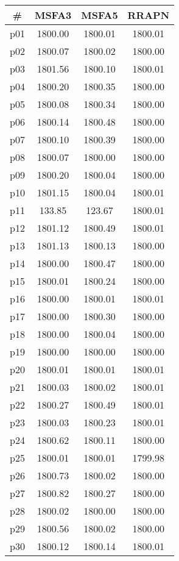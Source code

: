 \begin{tabular}{cccc}
\toprule
\textbf{\#} & \textbf{MSFA3} & \textbf{MSFA5} & \textbf{RRAPN}\\
\midrule
p01 & 1800.00 & 1800.01 & 1800.01\\
p02 & 1800.07 & 1800.02 & 1800.00\\
p03 & 1801.56 & 1800.10 & 1800.01\\
p04 & 1800.20 & 1800.35 & 1800.00\\
p05 & 1800.08 & 1800.34 & 1800.00\\
p06 & 1800.14 & 1800.48 & 1800.00\\
p07 & 1800.10 & 1800.39 & 1800.00\\
p08 & 1800.07 & 1800.00 & 1800.00\\
p09 & 1800.20 & 1800.04 & 1800.00\\
p10 & 1801.15 & 1800.04 & 1800.01\\
p11 & 133.85 & 123.67 & 1800.01\\
p12 & 1801.12 & 1800.49 & 1800.01\\
p13 & 1801.13 & 1800.13 & 1800.00\\
p14 & 1800.00 & 1800.47 & 1800.00\\
p15 & 1800.01 & 1800.24 & 1800.00\\
p16 & 1800.00 & 1800.01 & 1800.01\\
p17 & 1800.00 & 1800.30 & 1800.00\\
p18 & 1800.00 & 1800.04 & 1800.00\\
p19 & 1800.00 & 1800.00 & 1800.00\\
p20 & 1800.01 & 1800.01 & 1800.01\\
p21 & 1800.03 & 1800.02 & 1800.01\\
p22 & 1800.27 & 1800.49 & 1800.01\\
p23 & 1800.03 & 1800.23 & 1800.01\\
p24 & 1800.62 & 1800.11 & 1800.00\\
p25 & 1800.01 & 1800.01 & 1799.98\\
p26 & 1800.73 & 1800.02 & 1800.00\\
p27 & 1800.82 & 1800.27 & 1800.00\\
p28 & 1800.02 & 1800.00 & 1800.00\\
p29 & 1800.56 & 1800.02 & 1800.00\\
p30 & 1800.12 & 1800.14 & 1800.01\\
\bottomrule
\end{tabular}

